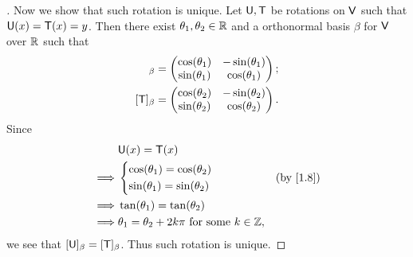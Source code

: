 \begin{proof}[]
  Now we show that such rotation is unique.
  Let \(\mathsf{U}, \mathsf{T}\) be rotations on \(\mathsf{V}\) such that \(\mathsf{U}(x) = \mathsf{T}(x) = y\).
  Then there exist \(\theta_1, \theta_2 \in \mathbb{R}\) and a orthonormal basis \(\beta\) for \(\mathsf{V}\) over \(\mathbb{R}\) such that
  \begin{align*}
    [\U]_{\beta} & = \begin{pmatrix}
                       \cos(\theta_1) & -\sin(\theta_1) \\
                       \sin(\theta_1) & \cos(\theta_1)
                     \end{pmatrix}; \\
    [\T]_{\beta} & = \begin{pmatrix}
                       \cos(\theta_2) & -\sin(\theta_2) \\
                       \sin(\theta_2) & \cos(\theta_2)
                     \end{pmatrix}.
  \end{align*}
  Since
  \begin{align*}
             & \U(x) = \T(x)                                             \\
    \implies & \begin{dcases}
                 \cos(\theta_1) = \cos(\theta_2) \\
                 \sin(\theta_1) = \sin(\theta_2)
               \end{dcases}                        &  & \by{1.8}         \\
    \implies & \tan(\theta_1) = \tan(\theta_2)                           \\
    \implies & \theta_1 = \theta_2 + 2 k \pi \text{ for some } k \in \Z,
  \end{align*}
  we see that \([\mathsf{U}]_{\beta} = [\mathsf{T}]_{\beta}\).
  Thus such rotation is unique.
\end{proof}

